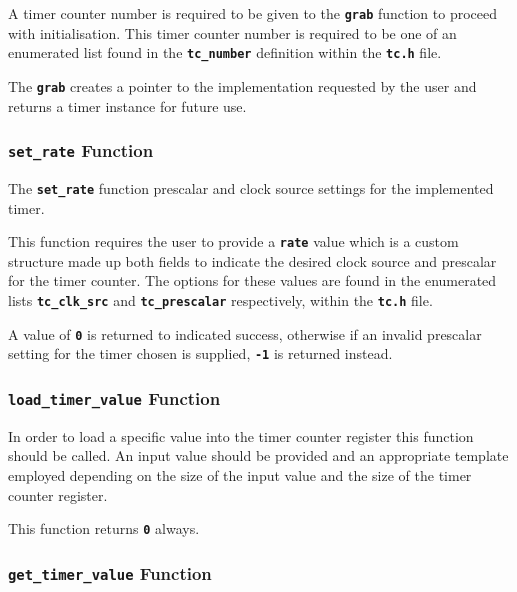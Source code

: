 \documentclass[a4paper, oneside, 11pt, titlepage, onecolumn, openright]{article}
\begin{document}
			A timer counter number is required to be given to the \textbf{\texttt{grab}} function to proceed with initialisation. This timer counter number is required to be one of an enumerated list found in the \textbf{\texttt{tc\_number}} definition within the \textbf{\texttt{tc.h}} file. 
			
			The \textbf{\texttt{grab}} creates a pointer to the implementation requested by the user and returns a timer instance for future use. 
			
\subsubsection{\textbf{\texttt{set\_rate}} Function}
			\label{sss:HALtcset_rateFunction}
			
			The \textbf{\texttt{set\_rate}} function prescalar and clock source settings for the implemented timer.
			
			This function requires the user to provide a \textbf{\texttt{rate}} value which is a custom structure made up both fields to indicate the desired clock source and prescalar for the timer counter. The options for these values are found in the enumerated lists \textbf{\texttt{tc\_clk\_src}} and \textbf{\texttt{tc\_prescalar}} respectively, within the \textbf{\texttt{tc.h}} file.
			
			A value of \textbf{\texttt{0}} is returned to indicated success, otherwise if an invalid prescalar setting for the timer chosen is supplied, \textbf{\texttt{-1}} is returned instead.
			
\subsubsection{\textbf{\texttt{load\_timer\_value}} Function}
			\label{sss:HALtcload_timer_valueFunction}
			
			In order to load a specific value into the timer counter register this function should be called. An input value should be provided and an appropriate template employed depending on the size of the input value and the size of the timer counter register.
			
			This function returns \textbf{\texttt{0}} always.
			
\subsubsection{\textbf{\texttt{get\_timer\_value}} Function}
			\label{sss:HALtcget_timer_valueFunction}
			
\end{document}
